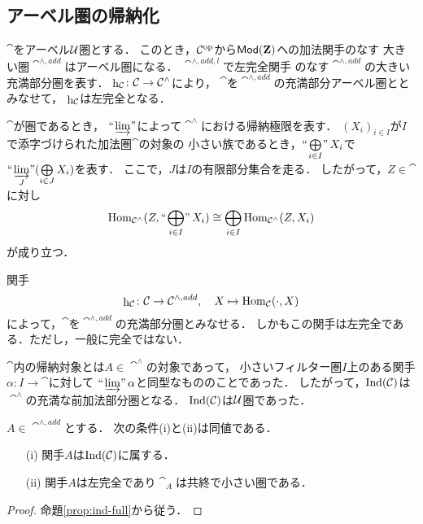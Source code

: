 \setcounter{subsection}{2}
\subsection[アーベル圏の帰納化]{アーベル圏の帰納化}

$\cat$をアーベル$\mathcal{U}$圏とする．
このとき，$\mathcal{C}^{\rm op}$から$\mathop{\textsf{Mod}}\nolimits(\mathbf{Z})$への加法関手のなす
大きい圏$\cat^{\wedge,add}$はアーベル圏になる．
$\cat^{\wedge,add,l}$で左完全関手
のなす$\cat^{\wedge,add}$の大きい充満部分圏を表す．
$\mathop{\mathrm{h}}\nolimits_{\mathcal{C}}\colon\mathcal{C}\to\mathcal{C}^\wedge$により，
$\cat$を$\cat^{\wedge,add}$の充満部分アーベル圏ととみなせて，
$\mathop{\mathrm{h}}\nolimits_{\mathcal{C}}$は左完全となる．

\begin{Notation}
    $\cat$が圏であるとき，
    $\mathop{\text{``}\hspace{-0.7pt}\varinjlim\hspace{-1.5pt}\text{''}}$によって$\cat^\wedge$における帰納極限を表す．
    $(X_i)_{i\in I}$が$I$で添字づけられた加法圏$\cat$の対象の
    小さい族であるとき，$\ind<\bigoplus_{i\in I}>X_i$で
    $\ind<\varinjlim_J>(\bigoplus\limits_{i\in J}X_i)$を表す．
    ここで，$J$は$I$の有限部分集合を走る．
    したがって，$Z\in\cat$に対し
    \begin{equation*}
        \Hom_{\cat^\wedge}(Z,\ind<\bigoplus_{i\in I}>X_i)
        \cong
        \bigoplus_{i\in I}\Hom_{\cat^\wedge}(Z,X_i)
    \end{equation*}
    が成り立つ．
\end{Notation}

関手
\begin{equation*}
    \mathop{\mathrm{h}}\nolimits_{\mathcal{C}}\colon\mathcal{C}\to\mathcal{C}^{\wedge,add},\quad X\mapsto\mathop{\mathrm{Hom}}\nolimits_{\mathcal{C}}(\cdot,X)
\end{equation*}
によって，$\cat$を$\cat^{\wedge,add}$の充満部分圏とみなせる．
しかもこの関手は左完全である．ただし，一般に完全ではない．

$\cat$内の帰納対象とは$A\in\cat^\wedge$の対象であって，
小さいフィルター圏$I$上のある関手$\alpha\colon I\to\cat$に対して
$\mathop{\text{``}\hspace{-0.7pt}\varinjlim\hspace{-1.5pt}\text{''}}\alpha$と同型なもののことであった．
したがって，$\mathop{\mathrm{Ind}}(\mathcal{C})$は$\cat^\wedge$の充満な前加法部分圏となる．
$\mathop{\mathrm{Ind}}(\mathcal{C})$は$\mathcal{U}$圏であった．

\begin{Proposition}
    $A\in\cat^{\wedge,add}$とする．
    次の条件(i)と(ii)は同値である．
    \begin{enumerate}
        \item [(i)]関手$A$は$\mathop{\mathrm{Ind}}(\mathcal{C})$に属する．
        \item [(ii)]関手$A$は左完全であり$\cat_A$は共終で小さい圏である．
    \end{enumerate}
\end{Proposition}
\begin{proof}
    命題\ref{prop:ind-full}から従う．
\end{proof}

